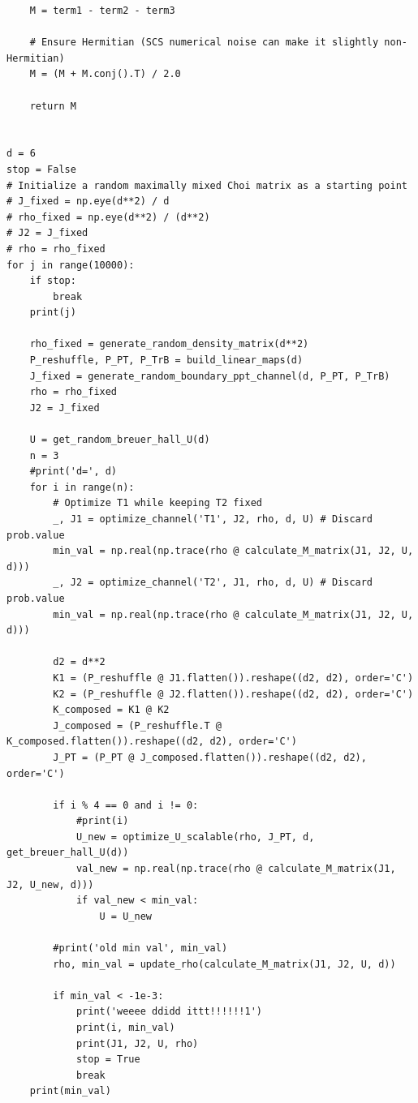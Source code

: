 \begin{lstlisting}
    M = term1 - term2 - term3
    
    # Ensure Hermitian (SCS numerical noise can make it slightly non-Hermitian)
    M = (M + M.conj().T) / 2.0
    
    return M


d = 6
stop = False
# Initialize a random maximally mixed Choi matrix as a starting point
# J_fixed = np.eye(d**2) / d 
# rho_fixed = np.eye(d**2) / (d**2)
# J2 = J_fixed
# rho = rho_fixed
for j in range(10000):
    if stop: 
        break
    print(j)
    
    rho_fixed = generate_random_density_matrix(d**2)
    P_reshuffle, P_PT, P_TrB = build_linear_maps(d)
    J_fixed = generate_random_boundary_ppt_channel(d, P_PT, P_TrB)
    rho = rho_fixed
    J2 = J_fixed
    
    U = get_random_breuer_hall_U(d)
    n = 3
    #print('d=', d)
    for i in range(n):
        # Optimize T1 while keeping T2 fixed
        _, J1 = optimize_channel('T1', J2, rho, d, U) # Discard prob.value
        min_val = np.real(np.trace(rho @ calculate_M_matrix(J1, J2, U, d)))
        _, J2 = optimize_channel('T2', J1, rho, d, U) # Discard prob.value
        min_val = np.real(np.trace(rho @ calculate_M_matrix(J1, J2, U, d)))
        
        d2 = d**2
        K1 = (P_reshuffle @ J1.flatten()).reshape((d2, d2), order='C')
        K2 = (P_reshuffle @ J2.flatten()).reshape((d2, d2), order='C')
        K_composed = K1 @ K2
        J_composed = (P_reshuffle.T @ K_composed.flatten()).reshape((d2, d2), order='C')
        J_PT = (P_PT @ J_composed.flatten()).reshape((d2, d2), order='C')
        
        if i % 4 == 0 and i != 0:
            #print(i)
            U_new = optimize_U_scalable(rho, J_PT, d, get_breuer_hall_U(d))
            val_new = np.real(np.trace(rho @ calculate_M_matrix(J1, J2, U_new, d)))
            if val_new < min_val:
                U = U_new
        
        #print('old min val', min_val)
        rho, min_val = update_rho(calculate_M_matrix(J1, J2, U, d))
    
        if min_val < -1e-3:
            print('weeee ddidd ittt!!!!!!1')
            print(i, min_val)
            print(J1, J2, U, rho)
            stop = True
            break
    print(min_val)
\end{lstlisting}


